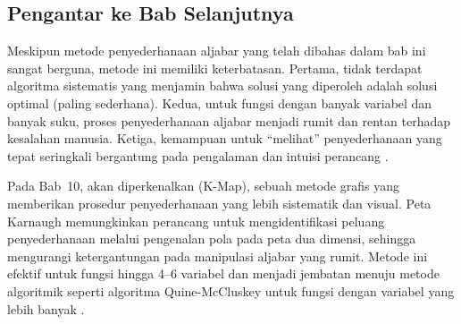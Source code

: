\subsection{Pengantar ke Bab Selanjutnya}

Meskipun metode penyederhanaan aljabar yang telah dibahas dalam bab ini sangat berguna, metode ini memiliki keterbatasan. Pertama, tidak terdapat algoritma sistematis yang menjamin bahwa solusi yang diperoleh adalah solusi optimal (paling sederhana). Kedua, untuk fungsi dengan banyak variabel dan banyak suku, proses penyederhanaan aljabar menjadi rumit dan rentan terhadap kesalahan manusia. Ketiga, kemampuan untuk ``melihat'' penyederhanaan yang tepat seringkali bergantung pada pengalaman dan intuisi perancang \cite{allaboutcircuits_boolean}.

Pada Bab~10, akan diperkenalkan  (K-Map), sebuah metode grafis yang memberikan prosedur penyederhanaan yang lebih sistematik dan visual. Peta Karnaugh memungkinkan perancang untuk mengidentifikasi peluang penyederhanaan melalui pengenalan pola pada peta dua dimensi, sehingga mengurangi ketergantungan pada manipulasi aljabar yang rumit. Metode ini efektif untuk fungsi hingga 4--6 variabel dan menjadi jembatan menuju metode algoritmik seperti algoritma Quine-McCluskey untuk fungsi dengan variabel yang lebih banyak \cite{wiki_karnaugh}.
